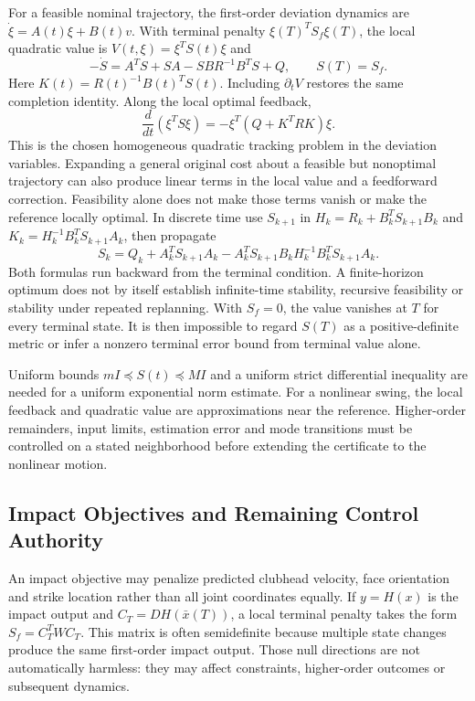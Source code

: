 For a feasible nominal trajectory, the first-order deviation dynamics are $\dot\xi=A(t)\xi+B(t)v$. With terminal penalty $\xi(T)^TS_f\xi(T)$, the local quadratic value is $V(t,\xi)=\xi^TS(t)\xi$ and
\begin{equation}
-\dot S=A^TS+SA-SBR^{-1}B^TS+Q,\qquad S(T)=S_f.
\end{equation}
Here $K(t)=R(t)^{-1}B(t)^TS(t)$. Including $\partial_t V$ restores the same completion identity. Along the local optimal feedback,
\begin{equation}
\frac{d}{dt}(\xi^TS\xi)=-\xi^T(Q+K^TRK)\xi.
\end{equation}
This is the chosen homogeneous quadratic tracking problem in the deviation variables. Expanding a general original cost about a feasible but nonoptimal trajectory can also produce linear terms in the local value and a feedforward correction. Feasibility alone does not make those terms vanish or make the reference locally optimal.
In discrete time use $S_{k+1}$ in $H_k=R_k+B_k^TS_{k+1}B_k$ and $K_k=H_k^{-1}B_k^TS_{k+1}A_k$, then propagate
\begin{equation}
S_k=Q_k+A_k^TS_{k+1}A_k-
A_k^TS_{k+1}B_kH_k^{-1}B_k^TS_{k+1}A_k.
\end{equation}
Both formulas run backward from the terminal condition. A finite-horizon optimum does not by itself establish infinite-time stability, recursive feasibility or stability under repeated replanning. With $S_f=0$, the value vanishes at $T$ for every terminal state. It is then impossible to regard $S(T)$ as a positive-definite metric or infer a nonzero terminal error bound from terminal value alone.

Uniform bounds $mI\preceq S(t)\preceq MI$ and a uniform strict differential inequality are needed for a uniform exponential norm estimate. For a nonlinear swing, the local feedback and quadratic value are approximations near the reference. Higher-order remainders, input limits, estimation error and mode transitions must be controlled on a stated neighborhood before extending the certificate to the nonlinear motion.

\subsection{Impact Objectives and Remaining Control Authority}

An impact objective may penalize predicted clubhead velocity, face orientation and strike location rather than all joint coordinates equally. If $y=H(x)$ is the impact output and $C_T=DH(\bar x(T))$, a local terminal penalty takes the form $S_f=C_T^TWC_T$. This matrix is often semidefinite because multiple state changes produce the same first-order impact output. Those null directions are not automatically harmless: they may affect constraints, higher-order outcomes or subsequent dynamics.

